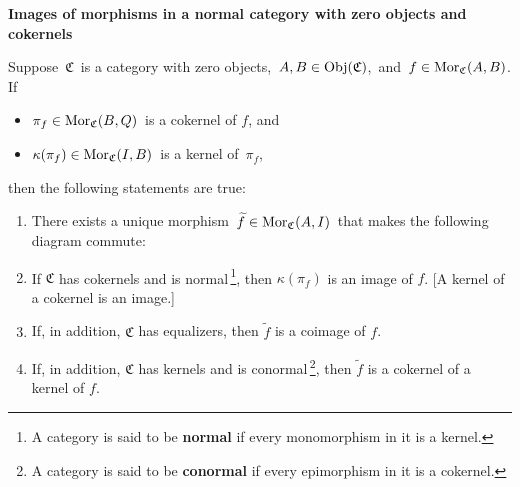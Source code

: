 \vskip 1.0cm
\noindent
\textbf{\large Images of morphisms in a normal category with zero objects and cokernels}


\vskip 0.5cm
\begin{proposition}\label{FactorizationIntoImageCoimage}
\mbox{}
\vskip 0.1cm
\noindent
Suppose \,$\mathfrak{C}$\, is a category with zero objects,
\,$A, B \in \textnormal{Obj}(\mathfrak{C})$,\, and
\,$f \in \textnormal{Mor}_{\mathfrak{C}}(A,B)$.
If
\begin{itemize}
\item
	$\pi_{f} \in \textnormal{Mor}_{\mathfrak{C}}(B,Q)$\, is a cokernel of $f$, and
\item
	$\kappa(\pi_{f}) \in \textnormal{Mor}_{\mathfrak{C}}(I,B)$\, is a kernel of \,$\pi_{f}$,
\end{itemize}
then the following statements are true:
\begin{enumerate}
\item
	There exists a unique morphism \,$\widetilde{f} \in \textnormal{Mor}_{\mathfrak{C}}(A,I)$\,
	that makes the following diagram commute: %
	\begin{center}
	\end{center}
\item
	If $\mathfrak{C}$ has cokernels and is
	normal\,\footnote{A category is said to be \textbf{normal} if every monomorphism in it is a kernel.},
	then $\kappa(\pi_{f})$ is an image of $f$. [A kernel of a cokernel is an image.]
\item
	If, in addition, $\mathfrak{C}$ has equalizers, then $\widetilde{f}$ is a coimage of $f$.
\item
	If, in addition, $\mathfrak{C}$ has kernels and is
	conormal\,\footnote{A category is said to be \textbf{conormal} if every epimorphism in it is a cokernel.},
	then $\widetilde{f}$ is a cokernel of a kernel of $f$.
\end{enumerate}
\end{proposition}
